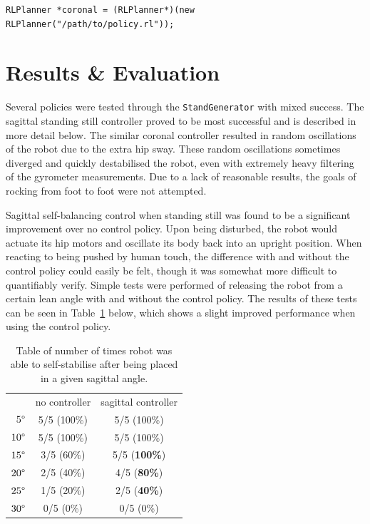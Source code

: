 \begin{lstlisting}
RLPlanner *coronal = (RLPlanner*)(new RLPlanner("/path/to/policy.rl"));
\end{lstlisting}

\newpage
\section{Results \& Evaluation}
\label{sec:rl_results}
Several policies were tested through the \texttt{StandGenerator} with mixed success. The sagittal standing still controller proved to be most successful and is described in more detail below. The similar coronal controller resulted in random oscillations of the robot due to the extra hip sway. These random oscillations sometimes diverged and quickly destabilised the robot, even with extremely heavy filtering of the gyrometer measurements. Due to a lack of reasonable results, the goals of rocking from foot to foot were not attempted.

Sagittal self-balancing control when standing still was found to be a significant improvement over no control policy. Upon being disturbed, the robot would actuate its hip motors and oscillate its body back into an upright position. When reacting to being pushed by human touch, the difference with and without the control policy could easily be felt, though it was somewhat more difficult to quantifiably verify. Simple tests were performed of releasing the robot from a certain lean angle with and without the control policy. The results of these tests can be seen in Table~\ref{tab:results} below, which shows a slight improved performance when using the control policy.

\begin{table}[h]
  \centering
    \begin{tabular}{ r|c|c| }
    \multicolumn{1}{r}{}
     &  \multicolumn{1}{c}{no controller}
     & \multicolumn{1}{c}{sagittal controller} \\
    \cline{2-3}
    $5\degree$ & 5/5 (100\%) & 5/5 (100\%) \\
    \cline{2-3}
    $10\degree$ & 5/5 (100\%) & 5/5 (100\%) \\
    \cline{2-3}
    $15\degree$ & 3/5 (60\%) & 5/5 (\textbf{100\%}) \\
    \cline{2-3}
    $20\degree$ & 2/5 (40\%) & 4/5 (\textbf{80\%}) \\
    \cline{2-3}
    $25\degree$ & 1/5 (20\%) & 2/5 (\textbf{40\%}) \\
    \cline{2-3}
    $30\degree$ & 0/5 (0\%) & 0/5 (0\%) \\
    \cline{2-3}
    \end{tabular}
  \caption{Table of number of times robot was able to self-stabilise after being placed in a given sagittal angle.}
  \label{tab:results}
\end{table}

